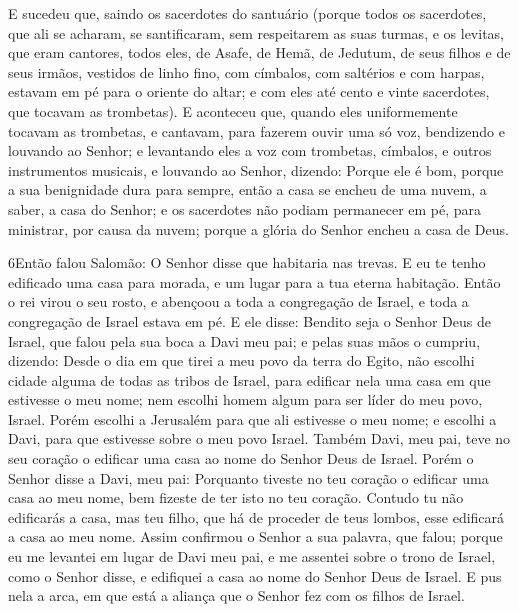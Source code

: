 E sucedeu que, saindo os sacerdotes do santuário (porque todos os
sacerdotes, que ali se acharam, se santificaram, sem respeitarem as
suas turmas, e os levitas, que eram cantores, todos eles, de
Asafe, de Hemã, de Jedutum, de seus filhos e de seus irmãos,
vestidos de linho fino, com címbalos, com saltérios e com harpas,
estavam em pé para o oriente do altar; e com eles até cento e vinte
sacerdotes, que tocavam as trombetas). E aconteceu que,
quando eles uniformemente tocavam as trombetas, e cantavam, para
fazerem ouvir uma só voz, bendizendo e louvando ao Senhor; e
levantando eles a voz com trombetas, címbalos, e outros instrumentos
musicais, e louvando ao Senhor, dizendo: Porque ele é bom, porque a
sua benignidade dura para sempre, então a casa se encheu de uma
nuvem, a saber, a casa do Senhor; e os sacerdotes não podiam
permanecer em pé, para ministrar, por causa da nuvem; porque a
glória do Senhor encheu a casa de Deus.

\medskip

\lettrine{6} Então falou Salomão: O Senhor disse que habitaria
nas trevas. E eu te tenho edificado uma casa para morada, e um
lugar para a tua eterna habitação. Então o rei virou o seu
rosto, e abençoou a toda a congregação de Israel, e toda a
congregação de Israel estava em pé. E ele disse: Bendito seja o
Senhor Deus de Israel, que falou pela sua boca a Davi meu pai; e
pelas suas mãos o cumpriu, dizendo: Desde o dia em que tirei a
meu povo da terra do Egito, não escolhi cidade alguma de todas as
tribos de Israel, para edificar nela uma casa em que estivesse o meu
nome; nem escolhi homem algum para ser líder do meu povo, Israel.
Porém escolhi a Jerusalém para que ali estivesse o meu nome; e
escolhi a Davi, para que estivesse sobre o meu povo Israel.
Também Davi, meu pai, teve no seu coração o edificar uma casa ao
nome do Senhor Deus de Israel. Porém o Senhor disse a Davi, meu
pai: Porquanto tiveste no teu coração o edificar uma casa ao meu
nome, bem fizeste de ter isto no teu coração. Contudo tu não
edificarás a casa, mas teu filho, que há de proceder de teus lombos,
esse edificará a casa ao meu nome. Assim confirmou o Senhor a
sua palavra, que falou; porque eu me levantei em lugar de Davi meu
pai, e me assentei sobre o trono de Israel, como o Senhor disse, e
edifiquei a casa ao nome do Senhor Deus de Israel. E pus nela
a arca, em que está a aliança que o Senhor fez com os filhos de
Israel.

